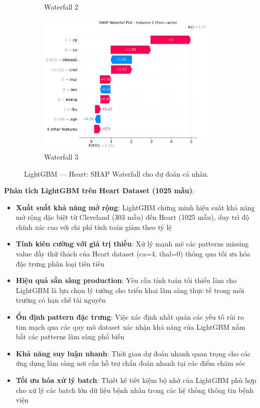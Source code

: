 \begin{figure}[H]
\begin{subfigure}[b]{0.31\textwidth}
\caption{Waterfall 2}\label{fig:lgbm_heart_waterfall2}
\end{subfigure}\hfill
\begin{subfigure}[b]{0.31\textwidth}\centering
\includegraphics[width=0.95\textwidth]{Result/heart_dataset/LightGBM/SHAP/Waterfall 3.png}
\caption{Waterfall 3}\label{fig:lgbm_heart_waterfall3}
\end{subfigure}
\caption{LightGBM — Heart: SHAP Waterfall cho dự đoán cá nhân.}
\label{fig:lgbm_heart_waterfalls}
\end{figure}

\textbf{Phân tích LightGBM trên Heart Dataset (1025 mẫu)}:
\begin{itemize}[leftmargin=*]
    \item \textbf{Xuất suất khả năng mở rộng}: LightGBM chứng minh hiệu suất khả năng mở rộng đặc biệt từ Cleveland (303 mẫu) đến Heart (1025 mẫu), duy trì độ chính xác cao với chi phí tính toán giảm theo tỷ lệ
    \item \textbf{Tính kiên cường với giá trị thiếu}: Xử lý mạnh mẽ các patterns missing value đầy thử thách của Heart dataset (ca=4, thal=0) thông qua tối ưu hóa đặc trưng phân loại tiên tiến
    \item \textbf{Hiệu quả sẵn sàng production}: Yêu cầu tính toán tối thiểu làm cho LightGBM là lựa chọn lý tưởng cho triển khai lâm sàng thực tế trong môi trường có hạn chế tài nguyên
    \item \textbf{Ổn định pattern đặc trưng}: Việc xác định nhất quán các yếu tố rủi ro tim mạch qua các quy mô dataset xác nhận khả năng của LightGBM nắm bắt các patterns lâm sàng phổ biến
    \item \textbf{Khả năng suy luận nhanh}: Thời gian dự đoán nhanh quan trọng cho các ứng dụng lâm sàng nơi cần hỗ trợ chẩn đoán nhanh tại các điểm chăm sóc
    \item \textbf{Tối ưu hóa xử lý batch}: Thiết kế tiết kiệm bộ nhớ của LightGBM phù hợp cho xử lý các batch lớn dữ liệu bệnh nhân trong các hệ thống thông tin bệnh viện
\end{itemize}

